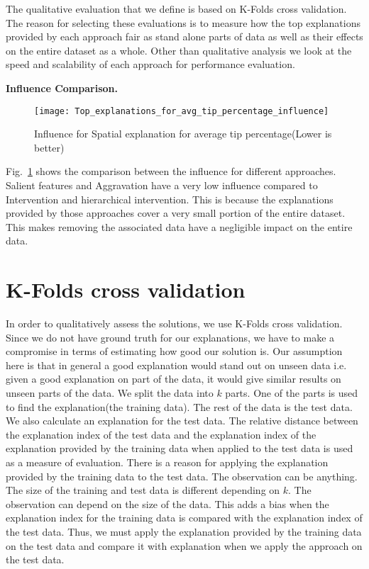 The qualitative evaluation that we define is based on K-Folds cross validation. The reason for selecting these evaluations is to measure how the top explanations provided by each approach fair as stand alone parts of data as well as their effects on the entire dataset as a whole. Other than qualitative analysis we look at the speed and scalability of each approach for performance evaluation.

\textbf{Influence Comparison.}
\begin{figure}[h]
\texttt{[image: Top\_explanations\_for\_avg\_tip\_percentage\_influence]}
\caption{Influence for Spatial explanation for average tip percentage(Lower is better)}
\label{fig:influence_comparison}
\end{figure}

Fig.~\ref{fig:influence_comparison} shows the comparison between the influence for different approaches. Salient features and Aggravation have a very low influence compared to Intervention and hierarchical intervention. This is because the explanations provided by those approaches cover a very small portion of the entire dataset. This makes removing the associated data have a negligible impact on the entire data.

\section{K-Folds cross validation}
In order to qualitatively assess the solutions, we use K-Folds cross validation\citep{refaeilzadeh2009cross}. Since we do not have ground truth for our explanations, we have to make a compromise in terms of estimating how good our solution is. Our assumption here is that in general a good explanation would stand out on unseen data i.e. given a good explanation on part of the data, it would give similar results on unseen parts of the data. We split the data into $k$ parts. One of the parts is used to find the explanation(the training data). The rest of the data is the test data. We also calculate an explanation for the test data. The relative distance between the explanation index of the test data and the explanation index of the explanation provided by the training data when applied to the test data is used as a measure of evaluation. 
There is a reason for applying the explanation provided by the training data to the test data. The observation can be anything. The size of the training and test data is different depending on $k$. The observation can depend on the size of the data. This adds a bias when the explanation index for the training data is compared with the explanation index of the test data. Thus, we must apply the explanation provided by the training data on the test data and compare it with explanation when we apply the approach on the test data.

